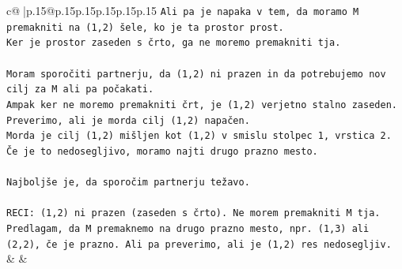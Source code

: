 \documentclass{article}
\begin{document}
{\begin{supertabular}{c@{$\;$}|p{.15\linewidth}@{}p{.15\linewidth}p{.15\linewidth}p{.15\linewidth}p{.15\linewidth}p{.15\linewidth}}
{{{\texttt{Ali pa je napaka v tem, da moramo M premakniti na (1,2) šele, ko je ta prostor prost.} \\
\texttt{Ker je prostor zaseden s črto, ga ne moremo premakniti tja.} \\
\\ 
\texttt{Moram sporočiti partnerju, da (1,2) ni prazen in da potrebujemo nov cilj za M ali pa počakati.} \\
\texttt{Ampak ker ne moremo premakniti črt, je (1,2) verjetno stalno zaseden.} \\
\texttt{Preverimo, ali je morda cilj (1,2) napačen.} \\
\texttt{Morda je cilj (1,2) mišljen kot (1,2) v smislu stolpec 1, vrstica 2.} \\
\texttt{Če je to nedosegljivo, moramo najti drugo prazno mesto.} \\
\\ 
\texttt{Najboljše je, da sporočim partnerju težavo.} \\
\\ 
\texttt{RECI: (1,2) ni prazen (zaseden s črto). Ne morem premakniti M tja. Predlagam, da M premaknemo na drugo prazno mesto, npr. (1,3) ali (2,2), če je prazno. Ali pa preverimo, ali je (1,2) res nedosegljiv.} \\
            }
        }
    }
    & & \\ \\


\end{supertabular}}
\end{document}
